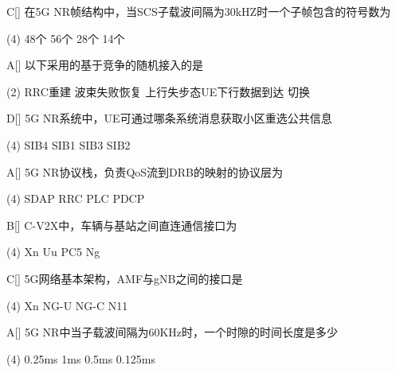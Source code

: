 \begin{choice}{C}[]
	在5G NR帧结构中，当SCS子载波间隔为30kHZ时一个子帧包含的符号数为
	\begin{tasks}(4)
		\task 48个
		\task 56个
		\task 28个
		\task 14个
	\end{tasks}
\end{choice}


\begin{choice}{A}[]
	以下采用的基于竞争的随机接入的是
	\begin{tasks}(2)
		\task RRC重建
		\task 波束失败恢复
		\task 上行失步态UE下行数据到达
		\task 切换
	\end{tasks}
\end{choice}

\begin{choice}{D}[]
	5G NR系统中，UE可通过哪条系统消息获取小区重选公共信息
	\begin{tasks}(4)
		\task SIB4
		\task SIB1
		\task SIB3
		\task SIB2
	\end{tasks}
\end{choice}


\begin{choice}{A}[]
	5G NR协议栈，负责QoS流到DRB的映射的协议层为
	\begin{tasks}(4)
		\task SDAP
		\task RRC
		\task PLC
		\task PDCP
	\end{tasks}
\end{choice}



\begin{choice}{B}[]
	C-V2X中，车辆与基站之间直连通信接口为
	\begin{tasks}(4)
		\task Xn
		\task Uu
		\task PC5
		\task Ng
	\end{tasks}
\end{choice}



\begin{choice}{C}[]
	5G网络基本架构，AMF与gNB之间的接口是
	\begin{tasks}(4)
		\task Xn
		\task NG-U
		\task NG-C
		\task N11
	\end{tasks}
\end{choice}




\begin{choice}{A}[]
	5G NR中当子载波间隔为60KHz时，一个时隙的时间长度是多少
	\begin{tasks}(4)
		\task 0.25ms
		\task 1ms
		\task 0.5ms
		\task 0.125ms
	\end{tasks}
\end{choice}

